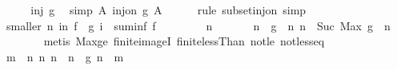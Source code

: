 \begin{isabellebody}
%
\isadelimproof
%
\endisadelimproof
%
\isatagproof
{}\isamarkupfalse%
\ {\isacharminus}{\kern0pt}\isanewline
\ \ \isamarkupfalse%
\ {\isacartoucheopen}inj\ g{\isacartoucheclose}\ \isamarkupfalse%
\ {\isacharbrackleft}{\kern0pt}simp{\isacharbrackright}{\kern0pt}{\isacharcolon}{\kern0pt}\ {\isachardoublequoteopen}{\isasymAnd}A{\isachardot}{\kern0pt}\ inj{\isacharunderscore}{\kern0pt}on\ g\ A{\isachardoublequoteclose}\isanewline
\ \ \ \ \isamarkupfalse%
\ {\isacharparenleft}{\kern0pt}rule\ subset{\isacharunderscore}{\kern0pt}inj{\isacharunderscore}{\kern0pt}on{\isacharparenright}{\kern0pt}\ simp\isanewline
\isanewline
\ \ \isamarkupfalse%
\ smaller{\isacharcolon}{\kern0pt}\ {\isachardoublequoteopen}{\isasymforall}n{\isachardot}{\kern0pt}\ {\isacharparenleft}{\kern0pt}{\isasymSum}i{\isacharless}{\kern0pt}n{\isachardot}{\kern0pt}\ {\isacharparenleft}{\kern0pt}f\ {\isasymcirc}\ g{\isacharparenright}{\kern0pt}\ i{\isacharparenright}{\kern0pt}\ {\isasymle}\ suminf\ f{\isachardoublequoteclose}\isanewline
\ \ \isamarkupfalse%
\isanewline
\ \ \ \ \isamarkupfalse%
\ n\isanewline
\ \ \ \ \isamarkupfalse%
\ {\isachardoublequoteopen}{\isasymforall}\ n{\isacharprime}{\kern0pt}\ {\isasymin}\ {\isacharparenleft}{\kern0pt}g\ {\isacharbackquote}{\kern0pt}\ {\isacharbraceleft}{\kern0pt}{\isachardot}{\kern0pt}{\isachardot}{\kern0pt}{\isacharless}{\kern0pt}n{\isacharbraceright}{\kern0pt}{\isacharparenright}{\kern0pt}{\isachardot}{\kern0pt}\ n{\isacharprime}{\kern0pt}\ {\isacharless}{\kern0pt}\ Suc\ {\isacharparenleft}{\kern0pt}Max\ {\isacharparenleft}{\kern0pt}g\ {\isacharbackquote}{\kern0pt}\ {\isacharbraceleft}{\kern0pt}{\isachardot}{\kern0pt}{\isachardot}{\kern0pt}{\isacharless}{\kern0pt}n{\isacharbraceright}{\kern0pt}{\isacharparenright}{\kern0pt}{\isacharparenright}{\kern0pt}{\isachardoublequoteclose}\isanewline
\ \ \ \ \ \ \isamarkupfalse%
\ {\isacharparenleft}{\kern0pt}metis\ Max{\isacharunderscore}{\kern0pt}ge\ finite{\isacharunderscore}{\kern0pt}imageI\ finite{\isacharunderscore}{\kern0pt}lessThan\ not{\isacharunderscore}{\kern0pt}le\ not{\isacharunderscore}{\kern0pt}less{\isacharunderscore}{\kern0pt}eq{\isacharparenright}{\kern0pt}\isanewline
\ \ \ \ \isamarkupfalse%
\ \isamarkupfalse%
\ m\ \ n{\isacharcolon}{\kern0pt}\ {\isachardoublequoteopen}{\isasymAnd}n{\isacharprime}{\kern0pt}{\isachardot}{\kern0pt}\ n{\isacharprime}{\kern0pt}\ {\isacharless}{\kern0pt}\ n\ {\isasymLongrightarrow}\ g\ n{\isacharprime}{\kern0pt}\ {\isacharless}{\kern0pt}\ m{\isachardoublequoteclose}\isanewline

\end{isabellebody}
